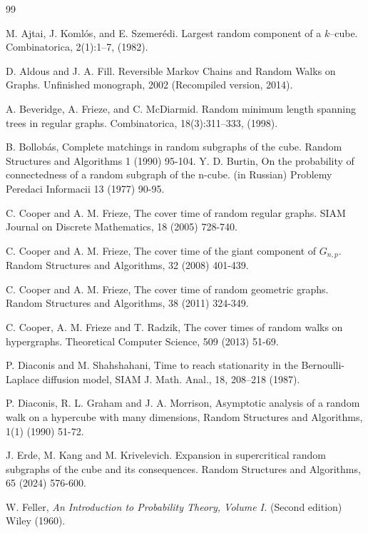 \documentclass[12pt]{article}
\begin{document}
\begin{thebibliography}{99}

 M. Ajtai, J. Komlós, and E. Szemerédi. Largest random component of a $k$--cube. Combinatorica, 2(1):1–7,
(1982).


  D. Aldous and J. A. Fill.
Reversible Markov Chains and Random Walks on Graphs.
Unfinished monograph, 2002 (Recompiled version, 2014).


  A. Beveridge, A. Frieze, and C. McDiarmid. Random minimum length spanning trees in regular graphs.
Combinatorica, 18(3):311–333, (1998).




 B. Bollobás, Complete matchings in random subgraphs of the cube. Random Structures and Algorithms 1 (1990) 95-104.
%
 Y. D. Burtin, On the probability of connectedness of a random subgraph of
the n-cube. (in Russian) Problemy Peredaci Informacii 13 (1977) 90-95.



  C. Cooper and A. M. Frieze, The cover time of random
regular graphs. { SIAM Journal on Discrete Mathematics}, 18 (2005) 728-740.
%


 C. Cooper and A. M. Frieze, The cover time of the giant component of $G_{n,p}$. { Random Structures and Algorithms},  32 (2008) 401-439.



 C. Cooper and A. M. Frieze, The cover time of random geometric graphs.
{ Random Structures and Algorithms}, 38 (2011) 324-349.
%


%
 C. Cooper, A. M. Frieze and T. Radzik, The cover times of random walks on hypergraphs.
{ Theoretical Computer Science},  509 (2013) 51-69.
%

 P. Diaconis and M. Shahshahani, Time to reach stationarity in the Bernoulli-Laplace diffusion model, SIAM J. Math. Anal., 18, 208–218 (1987).

 P. Diaconis, R. L. Graham and J. A. Morrison,
Asymptotic analysis of a random walk on a hypercube with many dimensions, Random Structures and Algorithms, 1(1) (1990) 51-72.


 J. Erde, M. Kang and M. Krivelevich. Expansion in supercritical random subgraphs of the cube and its consequences.  { Random Structures and Algorithms}, 65 (2024) 576-600.



 W. Feller, {\em An Introduction to Probability Theory, Volume I.}
(Second edition) Wiley (1960).


\end{thebibliography}
\end{document}
